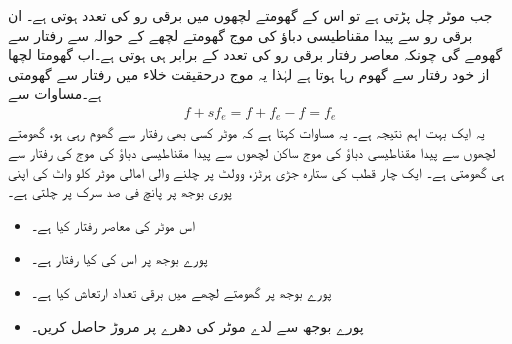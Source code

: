 جب موٹر چل پڑتی ہے تو اس کے گھومتے لچھوں میں برقی رو کی تعدد  ہوتی ہے۔ ان برقی رو سے پیدا مقناطیسی دباؤ کی موج گھومتے لچھے کے حوالہ سے  رفتار سے گھومے گی چونکہ معاصر رفتار برقی رو کی تعدد کے برابر ہی ہوتی ہے۔اب گھومتا لچھا از خود  رفتار سے گھوم رہا ہوتا ہے لہٰذا یہ موج درحقیقت خلاء میں  رفتار سے گھومتی ہے۔مساوات   سے
\begin{align}
f+s f_e=f +f_e-f=f_e
\end{align} 
یہ ایک بہت اہم نتیجہ ہے۔ یہ مساوات کہتا ہے کہ موٹر کسی بھی رفتار سے گھوم رہی ہو، گھومتے لچھوں سے پیدا مقناطیسی دباؤ کی موج ساکن لچھوں سے پیدا مقناطیسی دباؤ کی موج کی رفتار سے ہی گھومتی ہے۔
%
ایک چار قطب کی ستارہ جڑی  ہرٹز،  وولٹ  پر چلنے والی امالی موٹر  کلو واٹ کی اپنی پوری بوجھ پر پانچ فی صد سرک پر چلتی ہے۔
\begin{itemize}
\item
اس موٹر کی معاصر رفتار کیا ہے۔
\item
پورے بوجھ پر اس کی کیا رفتار ہے۔
\item
پورے بوجھ پر گھومتے لچھے میں برقی تعداد ارتعاش کیا ہے۔
\item
پورے بوجھ سے لدے موٹر کی دھرے پر مروڑ حاصل کریں۔
\end{itemize}

